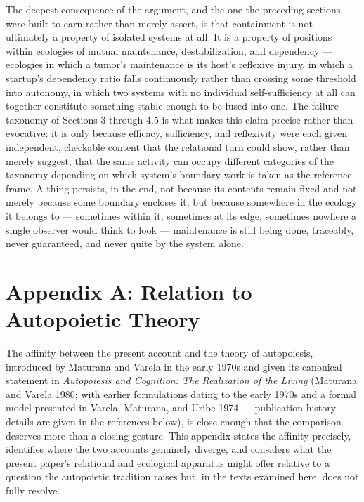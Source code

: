 \documentclass[11pt]{article}
\theoremstyle{plain}
\begin{document}
The deepest consequence of the argument, and the one the preceding sections were built to earn rather than merely assert, is that containment is not ultimately a property of isolated systems at all. It is a property of positions within ecologies of mutual maintenance, destabilization, and dependency --- ecologies in which a tumor's maintenance is its host's reflexive injury, in which a startup's dependency ratio falls continuously rather than crossing some threshold into autonomy, in which two systems with no individual self-sufficiency at all can together constitute something stable enough to be fused into one. The failure taxonomy of Sections 3 through 4.5 is what makes this claim precise rather than evocative: it is only because efficacy, sufficiency, and reflexivity were each given independent, checkable content that the relational turn could show, rather than merely suggest, that the same activity can occupy different categories of the taxonomy depending on which system's boundary work is taken as the reference frame. A thing persists, in the end, not because its contents remain fixed and not merely because some boundary encloses it, but because somewhere in the ecology it belongs to --- sometimes within it, sometimes at its edge, sometimes nowhere a single observer would think to look --- maintenance is still being done, traceably, never guaranteed, and never quite by the system alone.

\section*{Appendix A: Relation to Autopoietic Theory}

The affinity between the present account and the theory of autopoiesis, introduced by Maturana and Varela in the early 1970s and given its canonical statement in \emph{Autopoiesis and Cognition: The Realization of the Living} (Maturana and Varela 1980; with earlier formulations dating to the early 1970s and a formal model presented in Varela, Maturana, and Uribe 1974 --- publication-history details are given in the references below), is close enough that the comparison deserves more than a closing gesture. This appendix states the affinity precisely, identifies where the two accounts genuinely diverge, and considers what the present paper's relational and ecological apparatus might offer relative to a question the autopoietic tradition raises but, in the texts examined here, does not fully resolve.
\end{document}
